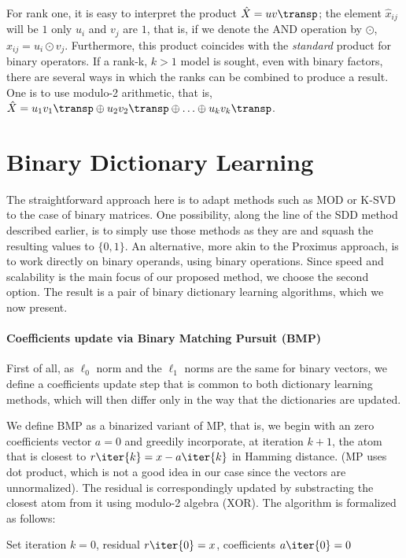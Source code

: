 \documentclass[a4paper]{IEEEtran}
\begin{document}
For rank one, it is easy to interpret the product $\hat{X}=uv\transp$; the element $\hat{x}_{ij}$ will be $1$ only $u_i$ and $v_j$ are $1$, that is, if we denote the AND operation by $\odot$,  $\hat{x}_{ij} = u_i \odot v_j$. Furthermore, this product coincides with the \emph{standard} product for binary operators. If a rank-k, $k>1$ model is sought, even with binary factors, there are several ways in which the ranks can be combined to produce a result. One is to use modulo-2 arithmetic, that is, $\hat{X} = u_1v_1\transp \oplus u_2v_2\transp \oplus \ldots \oplus u_kv_k\transp$. 


\section{Binary Dictionary Learning}

The straightforward approach here is to adapt methods such as MOD or K-SVD to the case of binary matrices. One possibility, along the line of the SDD method described earlier, is to simply use those methods as they are and squash the resulting values to $\{0,1\}$. An alternative, more akin to the Proximus approach, is to work directly on binary operands, using binary operations. Since speed and scalability is the main focus of our proposed method, we choose the second option. The result is a pair of binary dictionary learning algorithms, which we now present.

\paragraph{Coefficients update via Binary Matching Pursuit (BMP)}
First of all, as $\ell_0$ norm and the $\ell_1$ norms are the same for binary vectors, we define a coefficients update step that is common to both dictionary learning methods, which will then differ only in the way that the dictionaries are updated.

We define BMP as a binarized variant of MP, that is, we begin with an zero coefficients vector $a=0$ and greedily incorporate, at iteration $k+1$, the atom that is closest to  $r\iter{k} = x - a\iter{k}$ in Hamming distance. (MP uses dot product, which is not a good idea in our case since the vectors are unnormalized). %
The residual is correspondingly  updated by substracting the closest atom from it using modulo-2 algebra (XOR). The algorithm is formalized as follows:

\begin{algorithm}[ht]
Set iteration $k=0$, residual $r\iter{0}=x$, coefficients $a\iter{0}=0$\;
\label{alg:bmp}
\end{algorithm}
\end{document}
